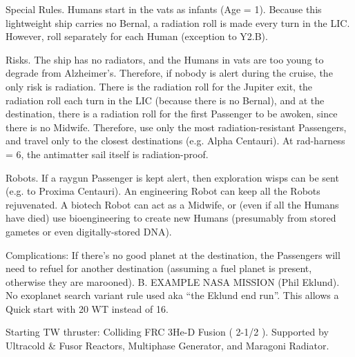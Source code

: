 \documentclass[a4paper]{book}
\begin{document}
Special Rules. Humans start in the vats as infants (Age = 1). Because this lightweight ship carries no Bernal, a radiation roll is made every turn in the LIC. However, roll separately for each Human (exception to Y2.B).

Risks. The ship has no radiators, and the Humans in vats are too young to degrade from Alzheimer’s. Therefore, if nobody is alert during the cruise, the only risk is radiation. There is the radiation roll for the Jupiter exit, the radiation roll each turn in the LIC (because there is no Bernal), and at the destination, there is a radiation roll for the first Passenger to be awoken, since there is no Midwife. Therefore, use only the most radiation-resistant Passengers, and travel only to the closest destinations (e.g. Alpha Centauri). At rad-harness = 6, the antimatter sail itself is radiation-proof.

Robots. If a raygun Passenger is kept alert, then exploration wisps can be sent (e.g. to Proxima Centauri). An engineering Robot can keep all the Robots rejuvenated. A biotech Robot can act as a Midwife, or (even if all the Humans have died) use bioengineering to create new Humans (presumably from stored gametes or even digitally-stored DNA).

Complications: If there's no good planet at the destination, the Passengers will need to refuel for another destination (assuming a fuel planet is present, otherwise they are marooned).
B. EXAMPLE NASA MISSION (Phil Eklund).
No exoplanet search variant rule used aka “the Eklund end run”. This allows a Quick start with 20 WT instead of 16.

Starting TW thruster: Colliding FRC 3He-D Fusion ( 2-1/2 ). Supported by Ultracold \& Fusor Reactors, Multiphase Generator, and Maragoni Radiator.
\end{document}
